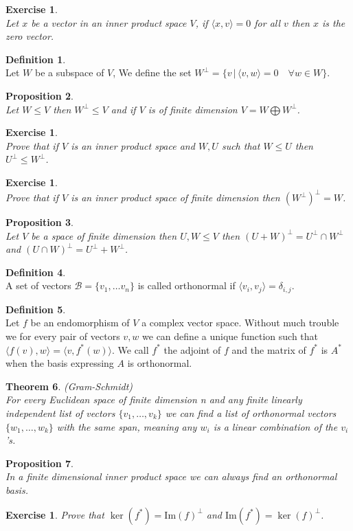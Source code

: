 \documentclass[12pt]{article}
\newcommand{\double}{\hspace{2pt}}
\newtheorem{theorem}{Theorem}[section]
\newtheorem{prop}[theorem]{Proposition}
\theoremstyle{definition}
\newtheorem{definition}[theorem]{Definition}
\theoremstyle{remark}
\theoremstyle{plain}
\newtheorem{ex}[subsubsection]{Exercise}
\begin{document}
\begin{ex}\leavevmode \\
    Let $x$ be a vector in an inner product space $V$, if $\langle x,v\rangle=0$ for all $v$ then $x$ is the zero vector.
\end{ex}
\begin{definition}\leavevmode \\
    Let $W$ be a subspace of $V$, We define the set $W^{\perp}=\{v\double|\double\langle v,w\rangle=0\quad \forall w\in W\}$.
\end{definition}
\begin{prop}\leavevmode \\
    Let $W\leq V$ then $W^\perp \leq V$ and if $V$ is of finite dimension $V=W\bigoplus W^\perp$.
\end{prop}
\begin{ex}\leavevmode \\
    Prove that if $V$ is an inner product space and $W,U$ such that $W \leq U$ then $U^\perp \leq W^\perp$.
\end{ex}
\begin{ex}\leavevmode \\
    Prove that if $V$ is an inner product space of finite dimension then $(W^\perp)^\perp=W$.
\end{ex}
\begin{prop}\leavevmode \\
    Let $V$ be a space of finite dimension then $U,W\leq V$ then $(U+W)^\perp=U^\perp \cap W^\perp$ and $(U\cap W)^\perp=U^\perp+W^\perp$.
\end{prop}
\begin{definition}\leavevmode \\
    A set of vectors $\mathcal{B}=\{ v_1,\dots v_n\}$ is called orthonormal if $\langle  v_i,v_j\rangle=\delta_{i,j}$.
\end{definition}
\begin{definition}\leavevmode \\
    Let $f$ be an endomorphism of $V$ a complex vector space. Without much trouble we for every pair of vectors $v,w$ we can define a unique function such that $\langle f(v),w\rangle=\langle v,f^*(w)\rangle$. We call $f^*$ the adjoint of $f$ and the matrix of $f^*$ is $A^*$ when the basis expressing $A$ is orthonormal.
\end{definition}
\begin{theorem}\textup{(Gram-Schmidt)}\\
For every Euclidean space of finite dimension n and any finite linearly independent list of vectors $\{v_1,\dots,v_k\}$ we can find a list of orthonormal vectors $\{w_1,\dots,w_k\}$ with the same span, meaning any $w_i$ is a linear combination of the $v_i$'s.
\end{theorem}
\begin{prop}\leavevmode \\
    In a finite dimensional inner product space we can always find an orthonormal basis.
\end{prop}
\begin{ex}
    Prove that $\ker(f^*)=\mathrm{Im}(f)^\perp$ and $\mathrm{Im}(f^*)=\ker(f)^\perp$.
\end{ex}
\newpage
\end{document}
